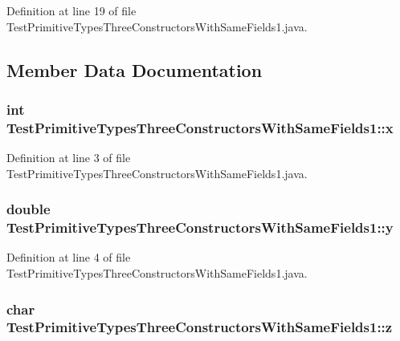 Definition at line 19 of file TestPrimitiveTypesThreeConstructorsWithSameFields1.java.



\subsection{Member Data Documentation}
\hypertarget{classTestPrimitiveTypesThreeConstructorsWithSameFields1_a18dca11d784c0346459504e2abef5b2b}{
\subsubsection[{x}]{\setlength{\rightskip}{0pt plus 5cm}int {\bf TestPrimitiveTypesThreeConstructorsWithSameFields1::x}}}
\label{classTestPrimitiveTypesThreeConstructorsWithSameFields1_a18dca11d784c0346459504e2abef5b2b}


Definition at line 3 of file TestPrimitiveTypesThreeConstructorsWithSameFields1.java.

\hypertarget{classTestPrimitiveTypesThreeConstructorsWithSameFields1_ad66f08825b2d1d88229487c0b3a7aca1}{
\subsubsection[{y}]{\setlength{\rightskip}{0pt plus 5cm}double {\bf TestPrimitiveTypesThreeConstructorsWithSameFields1::y}}}
\label{classTestPrimitiveTypesThreeConstructorsWithSameFields1_ad66f08825b2d1d88229487c0b3a7aca1}


Definition at line 4 of file TestPrimitiveTypesThreeConstructorsWithSameFields1.java.

\hypertarget{classTestPrimitiveTypesThreeConstructorsWithSameFields1_addf40fcecc5cabe1d4529367e7730369}{
\subsubsection[{z}]{\setlength{\rightskip}{0pt plus 5cm}char {\bf TestPrimitiveTypesThreeConstructorsWithSameFields1::z}}}
\label{classTestPrimitiveTypesThreeConstructorsWithSameFields1_addf40fcecc5cabe1d4529367e7730369}


